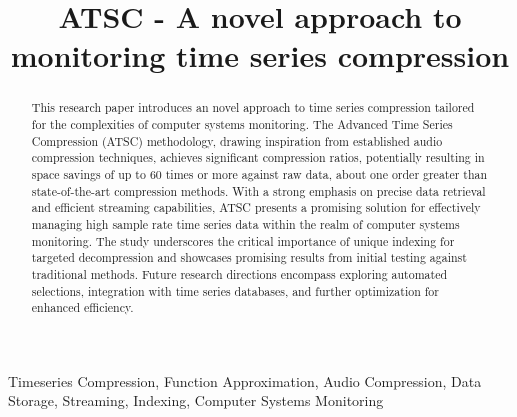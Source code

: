 \documentclass[conference]{IEEEtran}
\begin{document}
\title{ATSC - A novel approach to monitoring time series compression\\}

\author{
\and
{}
\and
{}
}

\maketitle

\begin{abstract}
    This research paper introduces an novel approach to time series compression tailored for the complexities of computer systems monitoring.
    The Advanced Time Series Compression (ATSC) methodology, drawing inspiration from established audio compression techniques, achieves significant compression ratios, potentially resulting in space savings of up to 60 times or more against raw data, about one order greater than state-of-the-art compression methods.
    With a strong emphasis on precise data retrieval and efficient streaming capabilities, ATSC presents a promising solution for effectively managing high sample rate time series data within the realm of computer systems monitoring.
    The study underscores the critical importance of unique indexing for targeted decompression and showcases promising results from initial testing against traditional methods.
    Future research directions encompass exploring automated selections, integration with time series databases, and further optimization for enhanced efficiency.
\end{abstract}
\vspace{5pt}
\begin{IEEEkeywords}
Timeseries Compression, Function Approximation, Audio Compression, Data Storage, Streaming, Indexing, Computer Systems Monitoring
\end{IEEEkeywords}
\end{document}
